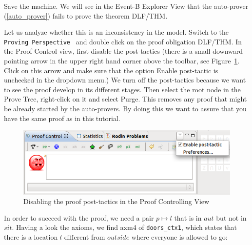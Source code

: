 Save the machine. We will see in the Event-B Explorer View that the auto-prover (\ref{auto_prover}) fails to prove the theorem \textsf{DLF/THM}.


Let us analyze whether this is an inconsistency in the model. Switch to the \texttt{Proving Perspective } and double click on the proof obligation \textsf{DLF/THM}.
In the Proof Control view, first disable the post-tactics (there is a small downward pointing arrow in the upper right hand corner above the toolbar, see Figure~\ref{fig_tut_10_post_tactics}.
Click on this arrow and make sure that the option \textsf{Enable post-tactic} is unchecked in the dropdown menu.)
We turn off the post-tactics because we want to see the proof develop in its different stages.
Then select the root node in the \textsf{Prove Tree}, right-click on it and select \textsf{Purge}.
This removes any proof that might be already started by the auto-provers.
By doing this we want to assure that you have the same proof as in this tutorial.

\begin{figure}[!ht]
  \begin{center}
    	\includegraphics{img/tutorial/tut_10_post_tactics.png}
    \caption{Disabling the proof post-tactics in the Proof Controlling View}
    \label{fig_tut_10_post_tactics}
  \end{center}
\end{figure}

In order to succeed with the proof, we need a pair $p \mapsto l$ that is in $aut$ but not in $sit$.
Having a look the axioms, we find  \textsf{axm4} of \texttt{doors\_ctx1}, which states that 
  there is a location $l$ different from $outside$ where everyone is allowed to go:


